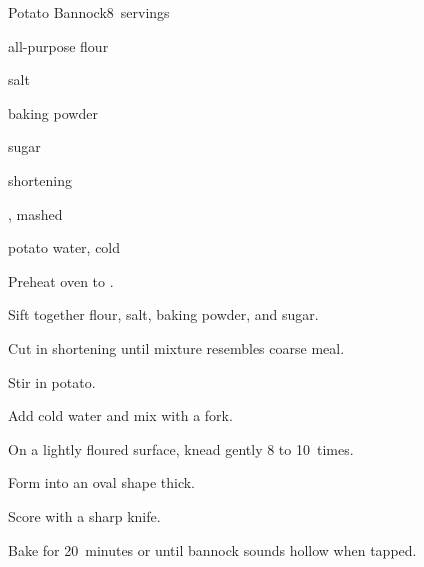 \begin{recipe}{Potato Bannock}{}{8~servings}

\begin{ingredients}
\item \C{2\third} all-purpose flour
\item {} salt
\item {} baking powder
\item {} sugar
\item {} shortening
\item \C{\threequarter} , mashed
\item {} potato water, cold
\end{ingredients}

\begin{directions}
\item Preheat oven to .
\item Sift together flour, salt, baking powder, and sugar.
\item Cut in shortening until mixture resembles coarse meal.
\item Stir in potato.
\item Add cold water and mix with a fork.
\item On a lightly floured surface, knead gently 8 to 10~times.
\item Form into an oval shape \inch{\threequarter} thick.
\item Score with a sharp knife.
\item Bake for 20~minutes or until bannock sounds hollow when tapped.
\end{directions}

\end{recipe}
